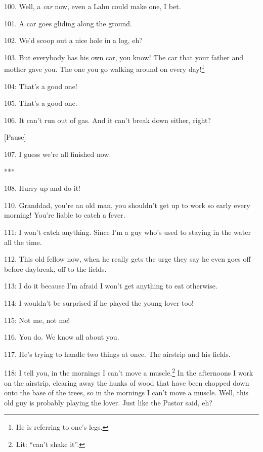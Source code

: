 100. Well, a \textit{car} now, even a Lahu could make one, I bet.

101. A car goes gliding along the ground.

102. We'd scoop out a nice hole in a log, eh?


103. But everybody has his own car, you know! The car that your father and mother
gave you. The one you go walking around on every day!\footnote{He is referring to one's legs.}

 104: That's a good one!

105. That's a good one.

106. It can't run out of gas. And it can't break down either, right?

\begin{center}
[Pause]
\end{center}

107. I guess we're all finished now.

\begin{center}
***
\end{center}

108. Hurry up and do it!

110. Granddad, you're an old man, you shouldn't get up to work so early every morning!
You're liable to catch a fever.

 111: I won't catch anything. Since I'm a guy who's
used to staying in the water all the time.

112. This old fellow now, when he really gets the urge they say he even goes off
before daybreak, off to the fields.

 113: I do it because I'm afraid I won't get anything
to eat otherwise.

 114: I wouldn't be surprised if he played the young lover
too!

 115: Not me, not me!

116. You do. We know all about you.

117. He's trying to handle two things at once. The airstrip and his fields.

 118: I tell you, in the mornings I can't
move a muscle.\footnote{Lit: ``can't shake it''.} In the afternoons I work on the airstrip, clearing away the
hunks of wood that have been chopped down onto the base of the trees, so in the
mornings I can't move a muscle. Well, this old guy is probably playing the lover.
Just like the Pastor said, eh?

